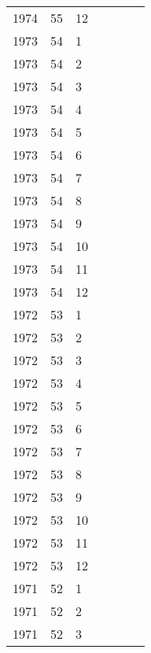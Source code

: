 \begin{longtable}{ |l|l|l|l|p{2.7cm}|l|p{2cm}| }
 1974 & 55 &    12 &         &                &  & \\
 1973 & 54 &     1 &         &                &  & \\
 1973 & 54 &     2 &         &                &  & \\
 1973 & 54 &     3 &         &                &  & \\
 1973 & 54 &     4 &         &                &  & \\
 1973 & 54 &     5 &         &                &  & \\
 1973 & 54 &     6 &         &                &  & \\
 1973 & 54 &     7 &         &                &  & \\
 1973 & 54 &     8 &         &                &  & \\
 1973 & 54 &     9 &         &                &  & \\
 1973 & 54 &    10 &         &                &  & \\
 1973 & 54 &    11 &         &                &  & \\
 1973 & 54 &    12 &         &                &  & \\
 1972 & 53 &     1 &         &                &  & \\
 1972 & 53 &     2 &         &                &  & \\
 1972 & 53 &     3 &         &                &  & \\
 1972 & 53 &     4 &         &                &  & \\
 1972 & 53 &     5 &         &                &  & \\
 1972 & 53 &     6 &         &                &  & \\
 1972 & 53 &     7 &         &                &  & \\
 1972 & 53 &     8 &         &                &  & \\
 1972 & 53 &     9 &         &                &  & \\
 1972 & 53 &    10 &         &                &  & \\
 1972 & 53 &    11 &         &                &  & \\
 1972 & 53 &    12 &         &                &  & \\
 1971 & 52 &     1 &         &                &  & \\
 1971 & 52 &     2 &         &                &  & \\
 1971 & 52 &     3 &         &                &  & \\

\end{longtable}
